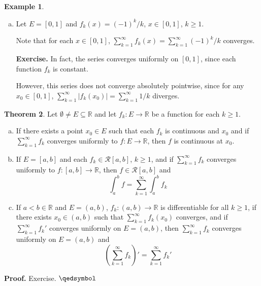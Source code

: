 \documentclass[11pt]{article}
\theoremstyle{definition}
\newtheorem{thm}{Theorem}[section]
\newtheorem{exmp}[thm]{Example}
\newcommand{\mbR}{\ensuremath{\mathbb{R}}}
\begin{document}
\begin{exmp}
\begin{enumerate}[(a)]
\item Let $E = [0, 1]$ and $f_k(x) = (-1)^k / k$, $x \in [0, 1]$, $k \geq 1$.

Note that for each $x \in [0, 1]$, $\sum_{k=1}^\infty f_k(x) = \sum_{k=1}^\infty (-1)^k / k$ converges.

\textbf{Exercise.} In fact, the series converges uniformly on $[0, 1]$, since each function $f_k$ is constant.

However, this series does not converge absolutely pointwise, since for any $x_0 \in [0, 1]$, $\sum_{k=1}^\infty |f_k(x_0)| = \sum_{k=1}^\infty 1/k$ diverges.

\end{enumerate}
\end{exmp}

\begin{thm}
Let $\emptyset \ne E \subseteq \mbR$ and let $f_k : E \to \mbR$ be a function for each $k \geq 1$.
\begin{enumerate}[(a)] \vspace{-0.2cm}

\item If there exists a point $x_0 \in E$ such that each $f_k$ is continuous and $x_0$ and if $\sum_{k=1}^\infty f_k$ converges uniformly to $f : E \to \mbR$, then $f$ is continuous at $x_0$.

\item If $E = [a, b]$ and each $f_k \in \mathcal{R}[a, b]$, $k \geq 1$, and if $\sum_{k=1}^\infty f_k$ converges uniformly to $f : [a, b] \to \mbR$, then $f \in \mathcal{R}[a, b]$ and 
$$\int_a^b f = \sum_{k=1}^\infty \int_a^b f_k$$

\item If $a < b \in \mbR$ and $E = (a, b)$, $f_k : (a, b) \to \mbR$ is differentiable for all $k \geq 1$, if there exists $x_0 \in (a, b)$ such that $\sum_{k=1}^\infty f_k(x_0)$ converges, and if $\sum_{k=1}^\infty f_k'$ converges uniformly on $E = (a, b)$, then $\sum_{k=1}^\infty f_k$ converges uniformly on $E = (a, b)$ and
$$\left( \sum_{k=1}^\infty f_k \right)' = \sum_{k=1}^\infty f_k'$$
\end{enumerate}
\end{thm}
{\bf Proof.} Exercise. $\qedsymbol$
\end{document}
